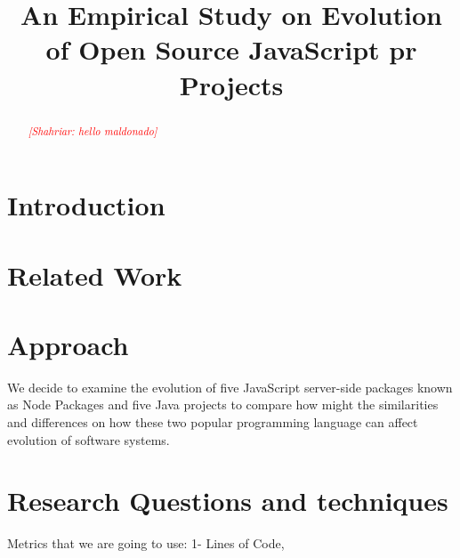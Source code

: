 \documentclass[conference]{IEEEtran}
\newcommand{\shahriar}[1]{\textcolor{red}{{\it [Shahriar: #1]}}}
\begin{document}
	\title{An Empirical Study on Evolution of Open Source JavaScript pr Projects}
	
	\author{
		
		}
	
	\maketitle
	
	\begin{abstract}
		\shahriar{hello maldonado}
		
	\end{abstract}
	
	\IEEEpeerreviewmaketitle
	
	\section{Introduction}
	\label{sec:introduction}
	
	\section{Related Work}
	\label{sec:related_work}
	
	
	
	\section{Approach}
	\label{sec:approach}
We decide to examine the evolution of five JavaScript server-side packages known as Node Packages and five Java projects to compare how might the similarities and differences on how these two popular programming language can affect evolution of software systems. 
	
	\section{Research Questions and techniques}
	Metrics that we are going to use: 
	1- Lines of Code,
	
\end{document}
